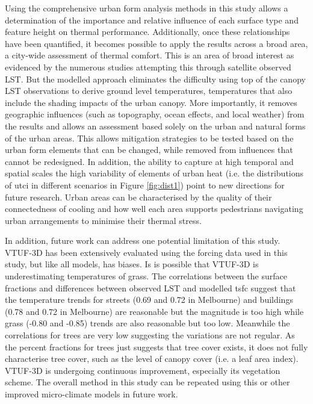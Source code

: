 \documentclass[final,3p,times,authoryear]{elsarticle}
\begin{document}
Using the comprehensive urban form analysis methods in this study allows a determination of the importance and relative influence of each surface type and feature height on thermal performance. Additionally, once these relationships have been quantified, it becomes possible to apply the results across a broad area, a city-wide assessment of thermal comfort. This is an area of broad interest as evidenced by the numerous studies attempting this through satellite observed LST. But the modelled approach eliminates the difficulty using top of the canopy LST observations to derive ground level temperatures, temperatures that also include the shading impacts of the urban canopy. More importantly, it removes geographic influences (such as topography, ocean effects, and local weather) from the results and allows an assessment based solely on the urban and natural forms of the urban areas. This allows mitigation strategies to be tested based on the urban form elements that can be changed, while removed from influences that cannot be redesigned. In addition, the ability to capture at high temporal and spatial scales the high variability of elements of urban heat (i.e. the distributions of \gls{utci} in different scenarios in Figure \ref{fig:dist1}) point to new directions for future research. Urban areas can be characterised by the quality of their connectedness of cooling and how  well each area supports pedestrians navigating urban arrangements to minimise their thermal stress.

In addition, future work can address one potential limitation of this study. VTUF-3D has been extensively evaluated using the forcing data used in this study, but like all models, has biases. Is is possible that VTUF-3D is underestimating temperatures of grass. The correlations between the surface fractions and differences between observed LST and modelled \gls{tsfc} suggest that the temperature trends for streets (0.69 and 0.72 in Melbourne) and buildings (0.78 and 0.72 in Melbourne) are reasonable but the magnitude is too high while grass (-0.80 and -0.85) trends are also reasonable but too low. Meanwhile the correlations for trees are very low suggesting the variations are not regular. As the percent fractions for trees just suggests that tree cover exists, it does not fully characterise tree cover, such as the level of canopy cover (i.e. a leaf area index). VTUF-3D is undergoing continuous improvement, especially its vegetation scheme. The overall method in this study can be repeated using this or other improved micro-climate models in future work. 
\end{document}

